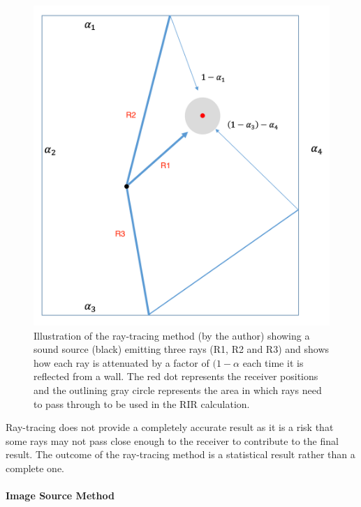 \documentclass[../../main.tex]{subfiles}
\begin{document}
			\begin{figure}[H]
				\center\includegraphics[scale = 0.5]{Sections/Background/images/rayTracingImage_edit.png}
				\caption{Illustration of the ray-tracing method (by the author) showing a sound source (black) emitting three rays (R1, R2 and R3) and shows how each ray is attenuated by a factor of $(1-\alpha$ each time it is reflected from a wall. The red dot represents the receiver positions and the outlining gray circle represents the area in which rays need to pass through to be used in the \ac{RIR} calculation.}
				\label{rayTracingImage}
			\end{figure}

			Ray-tracing does not provide a completely accurate result as it is a risk that some rays may not pass close enough to the receiver to contribute to the final result. The outcome of the ray-tracing method is a statistical result rather than a complete one.

		\paragraph{Image Source Method}

\end{document}
